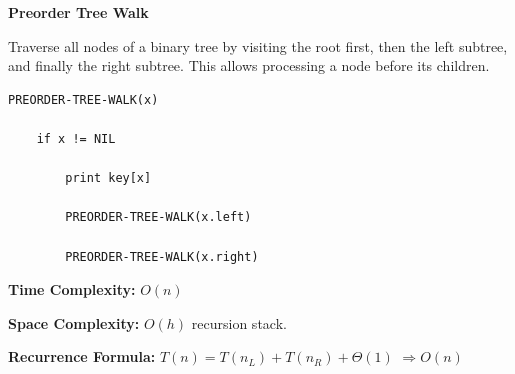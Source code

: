 \documentclass[a4paper,12pt]{article}
\begin{document}
\begin{tcolorbox}[
    colback=gray!30,
    colframe=black,
    boxrule=1pt,
    arc=0mm
]

\begin{tcolorbox}[
    colback=gray!10,
    colframe=black,
    arc=0mm
]
\centering
{\Huge\bfseries Preorder Tree Walk}
\end{tcolorbox}


\begin{tcolorbox}[
    colback=gray!10,
    colframe=black,
    arc=0mm
]
\small
Traverse all nodes of a binary tree by visiting the root first,
then the left subtree, and finally the right subtree.
This allows processing a node before its children.
\end{tcolorbox}


\begin{tcolorbox}[
    colback=black!5,
    colframe=black,
    arc=0mm,
    title=Pseudo-code
]
\tiny
\begin{lstlisting}
PREORDER-TREE-WALK(x)

    if x != NIL

        print key[x]

        PREORDER-TREE-WALK(x.left)

        PREORDER-TREE-WALK(x.right)
\end{lstlisting}
\end{tcolorbox}


\begin{tcolorbox}[
    colback=cyan!20,
    colframe=black,
    arc=0mm
]
\small
\textbf{Time Complexity:}
$O(n)$
\end{tcolorbox}


\begin{tcolorbox}[
    colback=violet!20,
    colframe=black,
    arc=0mm
]
\small
\textbf{Space Complexity:}
$O(h)$ recursion stack.
\end{tcolorbox}


\begin{tcolorbox}[
    colback=pink!20,
    colframe=black,
    arc=0mm
]
\small
\textbf{Recurrence Formula:}
$T(n)=T(n_L)+T(n_R)+\Theta(1)$
$\Rightarrow O(n)$
\end{tcolorbox}

\end{tcolorbox}
\end{document}
